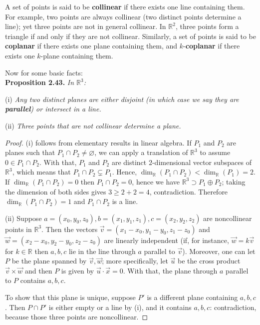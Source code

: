 \documentclass[leqno]{book}
\begin{document}
A set of points is said to be \textbf{collinear} if there exists one line containing them.  For example, two points are always collinear (two distinct points determine a line); yet three points are not in general collinear.  In $\mathbb R^2$, three points form a triangle if and only if they are not collinear.  Similarly, a set of points is said to be \textbf{coplanar} if there exists one plane containing them, and $k$-\textbf{coplanar} if there exists one $k$-plane containing them.

Now for some basic facts:\\

\noindent\textbf{Proposition 2.43.} \emph{In $\mathbb R^3$:}

(i) \emph{Any two distinct planes are either disjoint (in which case we say they are \textbf{parallel}) or intersect in a line.}

(ii) \emph{Three points that are not collinear determine a plane.}

\begin{proof}
(i) follows from elementary results in linear algebra.  If $P_1$ and $P_2$ are planes such that $P_1\cap P_2\ne\varnothing$, we can apply a translation of $\mathbb R^3$ to assume $0\in P_1\cap P_2$.  With that, $P_1$ and $P_2$ are distinct $2$-dimensional vector subspaces of $\mathbb R^3$, which means that $P_1\cap P_2\subsetneq P_1$.  Hence, $\dim_{\mathbb R}(P_1\cap P_2)<\dim_{\mathbb R}(P_1)=2$.  If $\dim_{\mathbb R}(P_1\cap P_2)=0$ then $P_1\cap P_2=0$, hence we have $\mathbb R^3\supset P_1\oplus P_2$; taking the dimension of both sides gives $3\geqslant 2+2=4$, contradiction.  Therefore $\dim_{\mathbb R}(P_1\cap P_2)=1$ and $P_1\cap P_2$ is a line.

(ii) Suppose $a=(x_0,y_0,z_0),b=(x_1,y_1,z_1),c=(x_2,y_2,z_2)$ are noncollinear points in $\mathbb R^3$.  Then the vectors $\vec v=(x_1-x_0,y_1-y_0,z_1-z_0)$ and $\vec w=(x_2-x_0,y_2-y_0,z_2-z_0)$ are linearly independent (if, for instance, $\vec w=k\vec v$ for $k\in\mathbb R$ then $a,b,c$ lie in the line through $a$ parallel to $\vec v$).  Moreover, one can let $P$ be the plane spanned by $\vec v,\vec w$; more specifically, let $\vec u$ be the cross product $\vec v\times\vec w$ and then $P$ is given by $\vec u\cdot\vec x=0$.  With that, the plane through $a$ parallel to $P$ contains $a,b,c$.

To show that this plane is unique, suppose $P'$ is a different plane containing $a,b,c$.  Then $P\cap P'$ is either empty or a line by (i), and it contains $a,b,c$: contradiction, because those three points are noncollinear.
\end{proof}
\end{document}
